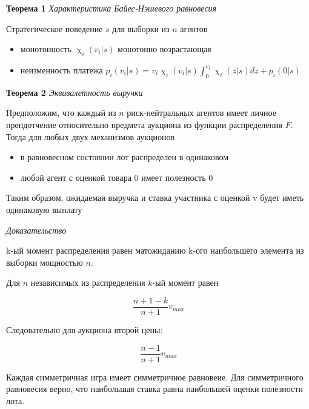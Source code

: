 
\textbf{Теорема 1} \textit{Характеристика Байес-Нэшевого равновесия}

Стратегическое поведение $s$ для выборки из $n$ агентов 

\begin{itemize}
    \item монотонность $\upchi_i(v_i|s)$ монотонно возрастающая 
    \item неизменность платежа $p_i(v_i|s) = v_i \upchi_i (v_i|s)  \int_0^{v_i} \upchi_i(z|s) dz + p_i(0|s)$
\end{itemize}


\textbf{Теорема 2} \textit{Эквивалетность выручки}

Предположим, что каждый из $n$ риск-нейтральных агентов имеет личное препдотчение относительно предмета аукциона из функции распределения $F$. Тогда для любых двух механизмов аукционов

\begin{itemize}
    \item в равновесном состоянии лот распределен в одинаковом 
    \item любой агент с оценкой товара 0 имеет полезность 0
\end{itemize}
Таким образом, ожидаемая выручка и ставка участника с оценкой v будет иметь одинаковую выплату

\textit{Доказательство}

k-ый момент распределения равен матожиданию k-ого наибольшего  элемента из  выборки мощностью $n$. 

Для $n$ независимых из распределения $k$-ый момент равен

$$
    \frac{n+1-k}{n+1} v_{max}
$$

Следовательно для аукциона второй цены:

$$
    \frac{n-1}{n+1} v_{max}
$$

Каждая симметричная игра имеет симметричное равновеие.  Для симметричного равновесия верно, что наибольшая ставка равна наибольшей оценки полезности лота.